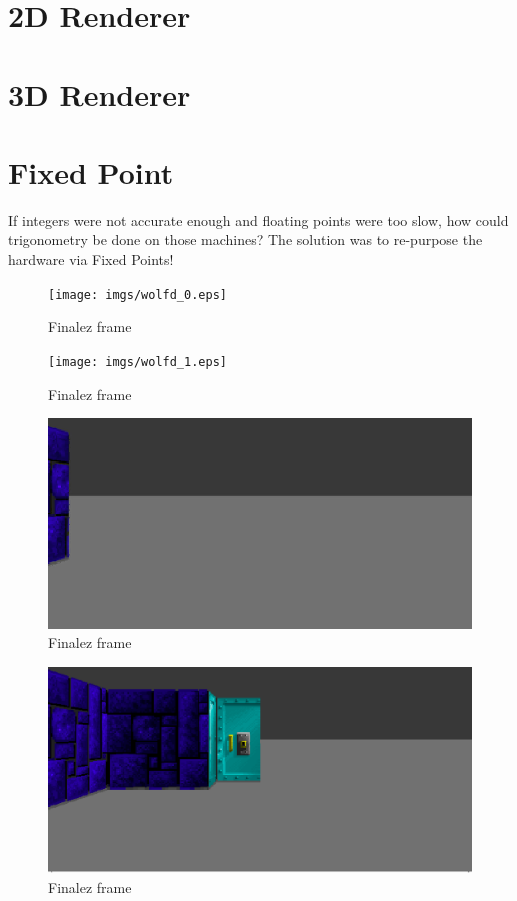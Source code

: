 \documentclass[book.tex]{subfiles}
\begin{document}
\section{2D Renderer}

\section{3D Renderer}
\section{Fixed Point}
If integers were not accurate enough and floating points were too slow, how could trigonometry be done on those machines? The solution was to re-purpose the hardware via Fixed Points!\\
\begin{figure}[H]
\centering
 \texttt{[image: imgs/wolfd\_0.eps]}
 \caption{Finalez frame} \label{fig:mips}
 \end{figure}


\begin{figure}[H]
\centering
 \texttt{[image: imgs/wolfd\_1.eps]}
 \caption{Finalez frame} \label{fig:mips}
 \end{figure}

 
     \begin{figure}[H]
\centering
 \includegraphics{imgs/wolfd_2_1.eps}
 \caption{Finalez frame} \label{fig:mips}
 \end{figure}
 
 \begin{figure}[H]
\centering
 \includegraphics{imgs/wolfd_2_2.eps}
 \caption{Finalez frame} \label{fig:mips}
 \end{figure}
 
\end{document}
